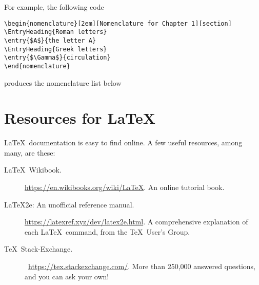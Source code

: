 \documentclass[11pt]{article}
\begin{document}
For example, the following code 
\begin{center}
\begin{minipage}{0.8\textwidth}
\begin{verbatim}
\begin{nomenclature}[2em][Nomenclature for Chapter 1][section]
\EntryHeading{Roman letters}
\entry{$A$}{the letter A}
\EntryHeading{Greek letters}
\entry{$\Gamma$}{circulation}
\end{nomenclature}
\end{verbatim}
\end{minipage}
\end{center}
produces the nomenclature list below
\begin{center}
\begin{minipage}{0.8\textwidth}
\begin{nomenclature}
\end{nomenclature}
\end{minipage}
\end{center}

\section*{Resources for \LaTeX}
\LaTeX\ documentation is easy to find online. A few useful resources, among many, are these:
\begin{description}
\item[\LaTeX\ Wikibook.] \url{https://en.wikibooks.org/wiki/LaTeX}. An online tutorial book.
\item[\LaTeX 2e: An unofficial reference manual.] \url{https://latexref.xyz/dev/latex2e.html}. A comprehensive explanation of each \LaTeX\ command, from the \TeX\ User's Group. 
\item[\TeX\ Stack-Exchange.]\ \url{https://tex.stackexchange.com/}. More than 250,000 answered questions, and you can ask your own!
\end{description}

\clearpage 
\end{document}
